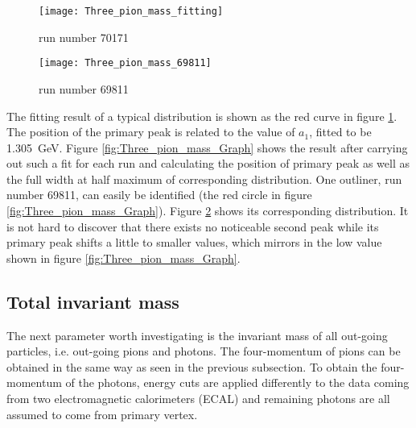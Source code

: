 \begin{figure*}[t!]
	\centering
	\begin{subfigure}{0.48\textwidth}
		\texttt{[image: Three\_pion\_mass\_fitting]}
		\caption{run number 70171}
		\label{fig:Three_pion_mass_fitting}
	\end{subfigure}
	\begin{subfigure}{0.48\textwidth}
		\texttt{[image: Three\_pion\_mass\_69811]}
		\caption{run number 69811}
		\label{fig:Three_pion_mass_69811}
	\end{subfigure}
	\caption{Three pion invariant mass distribution and their corresponding fit result. The fit range corresponds to \SI{30}{\percent} of of maximal value of the distribution. (a) Distribution of a normal run. The first peak (primary) locates at around \SI{1.3}{\giga\electronvolt}. The red curve matches data well  around the primary peak, but poorly around the second peak. (b) Distribution of an abnormal run. No second peak can be found on the right side of primary peak. Parameter $a_1$ is fitted to be \SI{1.034}{\giga\electronvolt}, which is slightly larger than a usual value due to the bad fit. }
	\label{fig:pion_mass}
\end{figure*}



The fitting result of a typical distribution is shown as the red curve in figure \ref{fig:Three_pion_mass_fitting}. The position of the primary peak is related to the value of $a_1$, fitted to be \SI{1.305}{\giga\electronvolt}. Figure \ref{fig:Three_pion_mass_Graph} shows the result after carrying out such a fit for each run and calculating the position of primary peak as well as the full width at half maximum of corresponding distribution. One outliner, run number 69811, can easily be identified (the red circle in figure \ref{fig:Three_pion_mass_Graph}). Figure \ref{fig:Three_pion_mass_69811} shows its corresponding distribution. It is not hard to discover that there exists no noticeable second peak while its primary peak shifts a little to smaller values, which mirrors in the low value shown in figure \ref{fig:Three_pion_mass_Graph}.
\subsection{Total invariant mass}
The next parameter worth investigating is the invariant mass of all out-going particles, i.e. out-going pions and photons. The four-momentum of pions can be obtained in the same way as seen in the previous subsection. To obtain the four-momentum of the photons, energy cuts are applied differently to the data coming from two electromagnetic calorimeters (ECAL) and remaining photons are all assumed to come from primary vertex.
